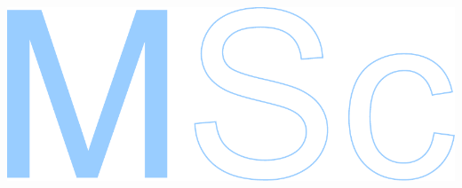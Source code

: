 \documentclass[11pt]{article}
\begin{document}



\begin{flushright}
	\vspace*{\fill}
	\begin{minipage}[b]{54mm}
		\includegraphics[scale=0.97]{msc}
	\end{minipage}
	\vspace*{1mm}
\end{flushright}
\end{document}
